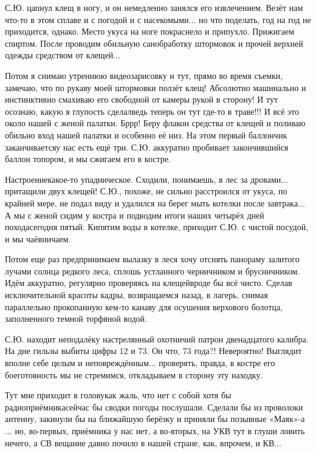 С.Ю. цапнул клещ в ногу, и он немедленно занялся его извлечением. Везёт нам что-то в этом сплаве и с погодой и с насекомыми$\ldots$ но что поделать, год на год не приходится, однако. Место укуса на ноге покраснело и припухло. Прижигаем спиртом. После проводим обильную санобработку штормовок и прочей верхней одежды средством от клещей$\ldots$
 
Потом я снимаю утреннюю видеозарисовку и тут, прямо во время съемки, замечаю, что по рукаву моей штормовки ползёт клещ! Абсолютно машинально и инстинктивно смахиваю его свободной от камеры рукой в сторону! И тут осознаю, какую я глупость сделал\mdash ведь теперь он тут где-то в траве!!! И всё это около нашей с женой палатки. Бр\sdash р\sdash р! Беру флакон средства от клещей и поливаю обильно вход нашей палатки и особенно её низ. На этом первый баллончик заканчивается\mdash у нас есть ещё три. С.Ю. аккуратно пробивает закончившийся баллон топором, и мы сжигаем его в костре. 

Настроение\mdash какое-то упадническое. Сходили, понимаешь, в лес за дровами$\ldots$ притащили двух клещей! С.Ю., похоже, не сильно расстроился от укуса, по крайней мере, не подал виду и удалился на берег мыть котелки после завтрака$\ldots$ А мы с женой сидим у костра и подводим итоги наших четырёх дней похода\mdash сегодня пятый. Кипятим воды в котелке, приходит С.Ю. с чистой посудой, и мы чаёвничаем.

Потом еще раз предпринимаем вылазку в лес\mdash я хочу отснять панораму залитого лучами солнца редкого леса, сплошь устланного черничником и брусничником. Идём аккуратно, регулярно проверяясь на клещей\mdash вроде бы всё чисто. Сделав исключительной красоты кадры, возвращаемся назад, в лагерь, снимая параллельно прокопанную кем-то канаву для осушения верхового болотца, заполненного темной торфяной водой.

С.Ю. находит неподалёку настрелянный охотничий патрон двенадцатого калибра. На дне гильзы выбиты цифры 12 и 73. Он что, 73 года?! Невероятно! Выглядит вполне себе целым и неповреждённым$\ldots$ проверять, правда, в костре его боеготовность мы не стремимся, откладываем в сторону эту находку. 

Тут мне приходит в голову\mdash как жаль, что нет с собой хотя бы радиоприёмника\mdash сейчас бы сводки погоды послушали. Сделали бы из проволоки антенну, закинули бы на ближайшую берёзку и приняли бы позывные «Маяк»-а$\ldots$ но, во-первых, приёмника у нас нет, а во-вторых, на УКВ тут в глуши ловить нечего, а СВ вещание давно почило в нашей стране, как, впрочем, и КВ$\ldots$

